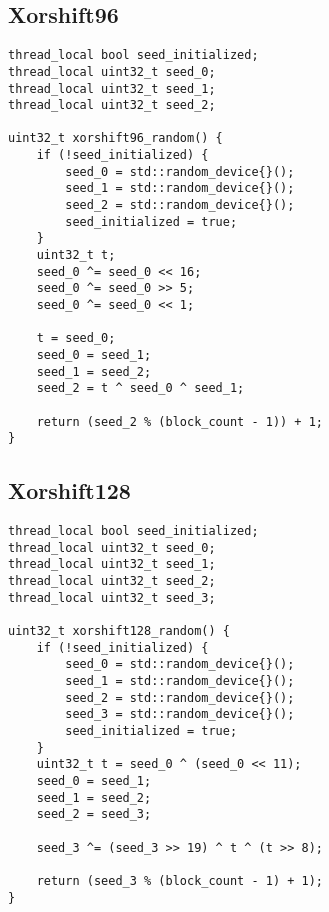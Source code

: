 \subsection[Xorshift96]{Xorshift96} \label{subsec:xorshift96}

\begin{@empty}
    \lstset{
        language = [ISO]C++,
        style = basic
    }
    \begin{lstlisting}
thread_local bool seed_initialized;
thread_local uint32_t seed_0;
thread_local uint32_t seed_1;
thread_local uint32_t seed_2;

uint32_t xorshift96_random() {
    if (!seed_initialized) {
        seed_0 = std::random_device{}();
        seed_1 = std::random_device{}();
        seed_2 = std::random_device{}();
        seed_initialized = true;
    }
    uint32_t t;
    seed_0 ^= seed_0 << 16;
    seed_0 ^= seed_0 >> 5;
    seed_0 ^= seed_0 << 1;

    t = seed_0;
    seed_0 = seed_1;
    seed_1 = seed_2;
    seed_2 = t ^ seed_0 ^ seed_1;

    return (seed_2 % (block_count - 1)) + 1;
}
    \end{lstlisting}
\end{@empty}

\subsection[Xorshift128]{Xorshift128} \label{subsec:xorshift128}

\begin{@empty}
    \lstset{
        language = [ISO]C++,
        style = basic
    }
    \begin{lstlisting}
thread_local bool seed_initialized;
thread_local uint32_t seed_0;
thread_local uint32_t seed_1;
thread_local uint32_t seed_2;
thread_local uint32_t seed_3;

uint32_t xorshift128_random() {
    if (!seed_initialized) {
        seed_0 = std::random_device{}();
        seed_1 = std::random_device{}();
        seed_2 = std::random_device{}();
        seed_3 = std::random_device{}();
        seed_initialized = true;
    }
    uint32_t t = seed_0 ^ (seed_0 << 11);
    seed_0 = seed_1;
    seed_1 = seed_2;
    seed_2 = seed_3;

    seed_3 ^= (seed_3 >> 19) ^ t ^ (t >> 8);

    return (seed_3 % (block_count - 1) + 1);
}
    \end{lstlisting}
\end{@empty}

